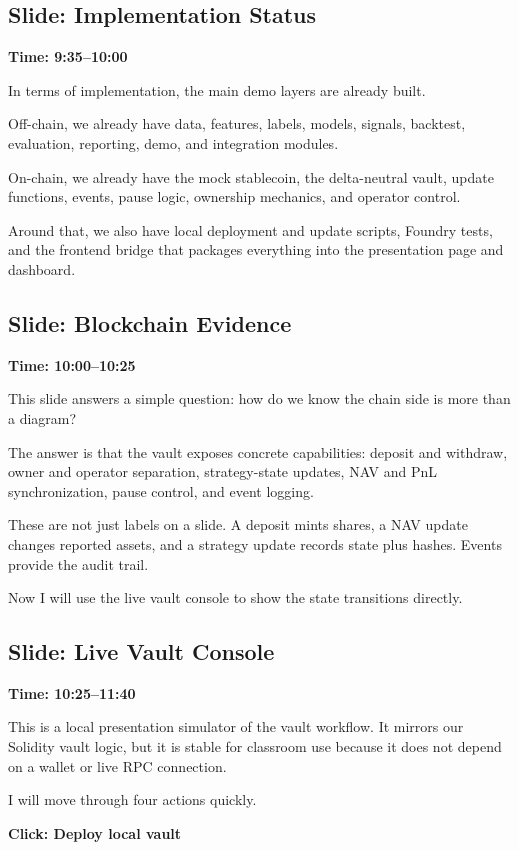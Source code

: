 \documentclass[11pt]{article}
\begin{document}
\subsection*{Slide: Implementation Status}
\textbf{Time: 9:35--10:00}

In terms of implementation, the main demo layers are already built.

Off-chain, we already have data, features, labels, models, signals, backtest, evaluation, reporting, demo, and integration modules.

On-chain, we already have the mock stablecoin, the delta-neutral vault, update functions, events, pause logic, ownership mechanics, and operator control.

Around that, we also have local deployment and update scripts, Foundry tests, and the frontend bridge that packages everything into the presentation page and dashboard.

\subsection*{Slide: Blockchain Evidence}
\textbf{Time: 10:00--10:25}

This slide answers a simple question: how do we know the chain side is more than a diagram?

The answer is that the vault exposes concrete capabilities: deposit and withdraw, owner and operator separation, strategy-state updates, NAV and PnL synchronization, pause control, and event logging.

These are not just labels on a slide. A deposit mints shares, a NAV update changes reported assets, and a strategy update records state plus hashes. Events provide the audit trail.

Now I will use the live vault console to show the state transitions directly.

\subsection*{Slide: Live Vault Console}
\textbf{Time: 10:25--11:40}

This is a local presentation simulator of the vault workflow. It mirrors our Solidity vault logic, but it is stable for classroom use because it does not depend on a wallet or live RPC connection.

I will move through four actions quickly.

\textbf{Click: Deploy local vault}
\end{document}
